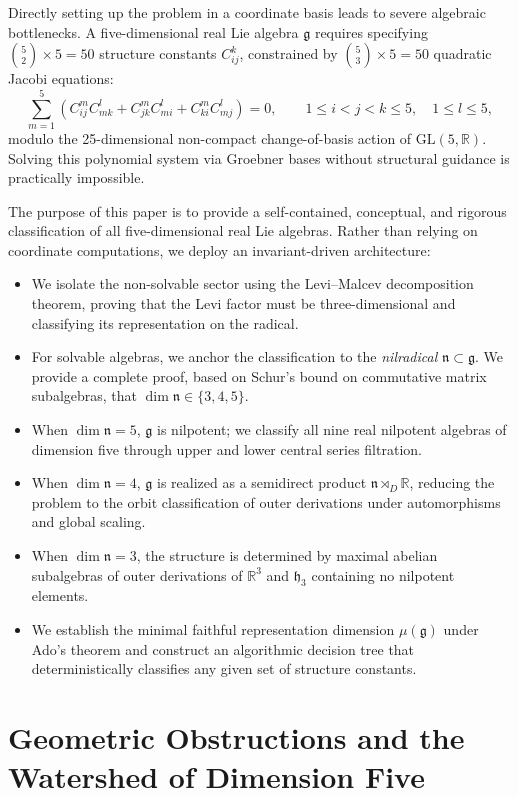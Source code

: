 \documentclass[11pt,a4paper]{article}
\theoremstyle{definition}
\theoremstyle{remark}
\newcommand{\R}{\mathbb{R}}
\newcommand{\g}{\mathfrak{g}}
\newcommand{\n}{\mathfrak{n}}
\newcommand{\hh}{\mathfrak{h}}
\begin{document}
Directly setting up the problem in a coordinate basis leads to severe algebraic bottlenecks. A five-dimensional real Lie algebra $\g$ requires specifying $\binom{5}{2} \times 5 = 50$ structure constants $C_{ij}^k$, constrained by $\binom{5}{3} \times 5 = 50$ quadratic Jacobi equations:
\begin{equation}
    \sum_{m=1}^5 \left( C_{ij}^m C_{mk}^l + C_{jk}^m C_{mi}^l + C_{ki}^m C_{mj}^l \right) = 0, \qquad 1 \le i < j < k \le 5, \quad 1 \le l \le 5,
\end{equation}
modulo the 25-dimensional non-compact change-of-basis action of $\mathrm{GL}(5,\R)$. Solving this polynomial system via Groebner bases without structural guidance is practically impossible.

The purpose of this paper is to provide a self-contained, conceptual, and rigorous classification of all five-dimensional real Lie algebras. Rather than relying on coordinate computations, we deploy an invariant-driven architecture:
\begin{itemize}
    \item We isolate the non-solvable sector using the Levi--Malcev decomposition theorem, proving that the Levi factor must be three-dimensional and classifying its representation on the radical.
    \item For solvable algebras, we anchor the classification to the \emph{nilradical} $\n \subset \g$. We provide a complete proof, based on Schur's bound on commutative matrix subalgebras, that $\dim \n \in \{3, 4, 5\}$.
    \item When $\dim \n = 5$, $\g$ is nilpotent; we classify all nine real nilpotent algebras of dimension five through upper and lower central series filtration.
    \item When $\dim \n = 4$, $\g$ is realized as a semidirect product $\n \rtimes_D \R$, reducing the problem to the orbit classification of outer derivations under automorphisms and global scaling.
    \item When $\dim \n = 3$, the structure is determined by maximal abelian subalgebras of outer derivations of $\R^3$ and $\hh_3$ containing no nilpotent elements.
    \item We establish the minimal faithful representation dimension $\mu(\g)$ under Ado's theorem and construct an algorithmic decision tree that deterministically classifies any given set of structure constants.
\end{itemize}

\section{Geometric Obstructions and the Watershed of Dimension Five}\label{sec:obstruction}
\end{document}
